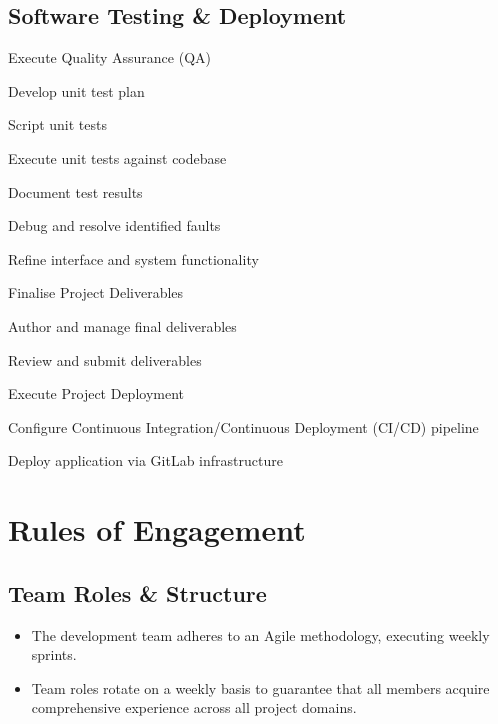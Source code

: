\documentclass[11pt, a4paper]{report}
\begin{document}
\vspace{1em}
\section{Software Testing \& Deployment}
\begin{wbs}
    \item Execute Quality Assurance (QA)
    \begin{wbs}
        \item Develop unit test plan
        \item Script unit tests
        \item Execute unit tests against codebase
        \begin{wbs}
            \item Document test results
            \item Debug and resolve identified faults
        \end{wbs}
        \item Refine interface and system functionality
    \end{wbs}
    
    \item Finalise Project Deliverables
    \begin{wbs}
        \item Author and manage final deliverables
        \item Review and submit deliverables
    \end{wbs}
    
    \item Execute Project Deployment
    \begin{wbs}
        \item Configure Continuous Integration/Continuous Deployment (CI/CD) pipeline
        \item Deploy application via GitLab infrastructure
    \end{wbs}
\end{wbs}


\chapter{Rules of Engagement}
\label{cp:engagement}

\section{Team Roles \& Structure}
\begin{itemize}
    \item The development team adheres to an Agile methodology, executing weekly sprints.
    \item Team roles rotate on a weekly basis to guarantee that all members acquire comprehensive experience across all project domains.
\end{itemize}
\end{document}
